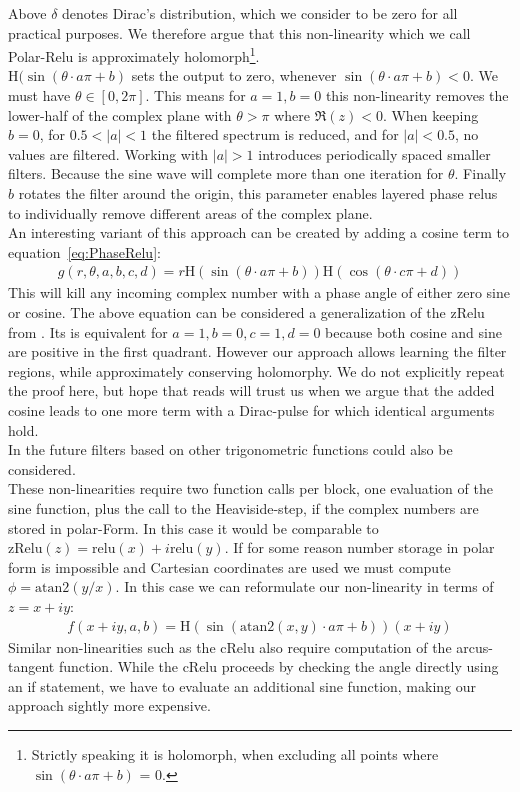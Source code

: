 \documentclass{article}
\begin{document}
Above $\delta$ denotes Dirac's distribution, which we consider to be zero for all practical purposes. 
We therefore argue that this non-linearity which we call Polar-Relu is approximately holomorph\footnote{Strictly speaking it is holomorph, when excluding all points where $\sin (\theta \cdot a\pi + b)$ = 0.}.\\
$\text{H}(\sin(\theta \cdot a \pi + b)$ sets the output to zero, whenever $\sin (\theta \cdot a\pi + b) < 0$. We must have $\theta \in [0, 2\pi]$. This means for $a = 1, b = 0$ this non-linearity removes the lower-half of the complex plane with $\theta > \pi$ where $\Re(z) < 0$. When keeping $b=0$, for $0.5 < |a| < 1$ the filtered spectrum is reduced, and for $|a| < 0.5$, no values are filtered. Working with $|a| > 1$ introduces periodically spaced smaller filters. Because the sine wave will complete more than one iteration for $\theta$. Finally $b$ rotates the filter around the origin, this parameter enables layered phase relus to individually remove different areas of the complex plane. \\
An interesting variant of this approach can be created by adding a cosine term to equation~\ref{eq:PhaseRelu}:
\begin{align}
g(r,\theta,a,b,c,d) = r \text{H}(\sin (\theta \cdot a\pi + b))\text{H}(\cos (\theta \cdot c\pi + d))
\end{align}
This will kill any incoming complex number with a phase angle of either zero sine or cosine. The above equation can be considered a generalization of the zRelu from \cite{Guberman}\cite{Trabelsi}. Its is equivalent for $a=1, b=0, c=1, d=0$ because both cosine and sine are positive in the first quadrant. However our approach allows learning the filter regions, while approximately conserving holomorphy. We do not explicitly repeat the proof here, but hope that reads will trust us when we argue that the added cosine leads to one more term with a Dirac-pulse for which identical arguments hold. \\
In the future filters based on other trigonometric functions could also be considered. \\

These non-linearities require two function calls per block, one evaluation of the sine function, plus the call to the Heaviside-step, if the complex numbers are stored in polar-Form. In this case it would be comparable to $\text{zRelu}(z) = \text{relu}(x) + i\text{relu}(y)$. If for some reason number storage in polar form is impossible and Cartesian coordinates are used we must compute $\phi = \text{atan2}(y/x)$.
In this case we can reformulate our non-linearity in terms of $z = x + iy$:
\begin{align}
f(x + iy, a, b) = \text{H}(\sin(\text{atan2}(x,y)\cdot a\pi + b))(x + iy)
\end{align}
Similar non-linearities such as the cRelu also require computation of the arcus-tangent function. While the cRelu proceeds by checking the angle directly using an if statement, we have to evaluate an additional sine function, making our approach sightly more expensive.
\end{document}
